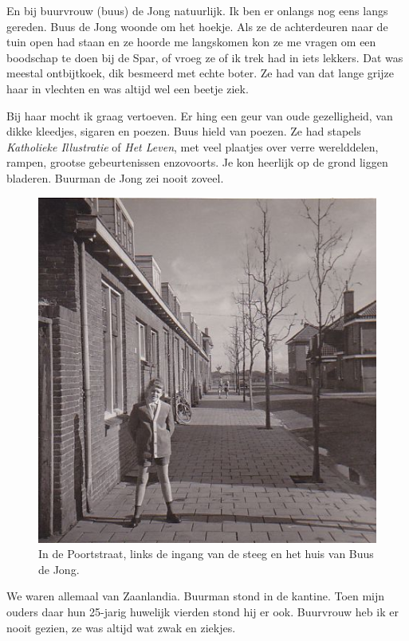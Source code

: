 \documentclass[12pt,twoside, openright]{memoir}
\begin{document}
En bij buurvrouw (buus) de Jong natuurlijk. Ik ben er onlangs nog eens langs gereden. Buus de Jong woonde om het hoekje. Als ze de achterdeuren naar de tuin open had staan en ze hoorde me langskomen kon ze me vragen om een boodschap te doen bij de Spar, of vroeg ze of ik trek had in iets lekkers. Dat was meestal ontbijtkoek, dik besmeerd met echte boter. Ze had van dat lange grijze haar in vlechten en was altijd wel een beetje ziek.

Bij haar mocht ik graag vertoeven. Er hing een geur van oude gezelligheid, van dikke kleedjes, sigaren en poezen. Buus hield van poezen. Ze had stapels \emph{Katholieke Illustratie} of \emph{Het Leven}, met veel plaatjes over verre werelddelen, rampen, grootse gebeurtenissen enzovoorts. Je kon heerlijk op de grond liggen bladeren. Buurman de Jong zei nooit zoveel. 

\begin{figure}
\centering
\includegraphics[width=\textwidth]{img/ch5/poortstrsteeg}
\caption*{\footnotesize In de Poortstraat, links de ingang van de steeg en het huis van Buus de Jong.}
\end{figure}

We waren allemaal van Zaanlandia. Buurman stond in de kantine. Toen mijn ouders daar hun 25-jarig huwelijk vierden stond hij er ook. Buurvrouw heb ik er nooit gezien, ze was altijd wat zwak en ziekjes. 
\end{document}
